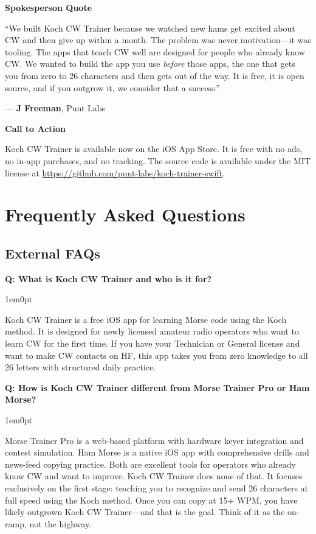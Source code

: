 \documentclass[11pt,letterpaper]{article}
\newcommand{\prsection}[1]{%
  \vspace{1em}%
  {\large\bfseries\color{SectionBlue}#1}%
  \vspace{0.3em}\par%
}
\newenvironment{faqpair}[1]{%
  \vspace{0.5em}%
  \noindent\textbf{\color{SectionBlue}Q: #1}\par%
  \vspace{0.2em}%
  \begin{adjustwidth}{1em}{0pt}%
  \setlength{\parindent}{0pt}%
}{%
  \end{adjustwidth}%
  \vspace{0.5em}%
}
\begin{document}
\prsection{Spokesperson Quote}

\begin{spokespersonquote}
``We built Koch CW Trainer because we watched new hams get excited about CW and then give up within a month. The problem was never motivation---it was tooling. The apps that teach CW well are designed for people who already know CW. We wanted to build the app you use \emph{before} those apps, the one that gets you from zero to 26 characters and then gets out of the way. It is free, it is open source, and if you outgrow it, we consider that a success.''

\raggedleft --- \textbf{J Freeman}, Punt Labs
\end{spokespersonquote}

\prsection{Call to Action}

Koch CW Trainer is available now on the iOS App Store. It is free with no ads, no in-app purchases, and no tracking. The source code is available under the MIT license at \url{https://github.com/punt-labs/koch-trainer-swift}.

\newpage


\section*{Frequently Asked Questions}


\subsection*{External FAQs}

\begin{faqpair}{What is Koch CW Trainer and who is it for?}
  Koch CW Trainer is a free iOS app for learning Morse code using the Koch method. It is designed for newly licensed amateur radio operators who want to learn CW for the first time. If you have your Technician or General license and want to make CW contacts on HF, this app takes you from zero knowledge to all 26 letters with structured daily practice.
\end{faqpair}

\begin{faqpair}{How is Koch CW Trainer different from Morse Trainer Pro or Ham Morse?}
  Morse Trainer Pro is a web-based platform with hardware keyer integration and contest simulation. Ham Morse is a native iOS app with comprehensive drills and news-feed copying practice. Both are excellent tools for operators who already know CW and want to improve. Koch CW Trainer does none of that. It focuses exclusively on the first stage: teaching you to recognize and send 26 characters at full speed using the Koch method. Once you can copy at 15+ WPM, you have likely outgrown Koch CW Trainer---and that is the goal. Think of it as the on-ramp, not the highway.
\end{faqpair}
\end{document}
